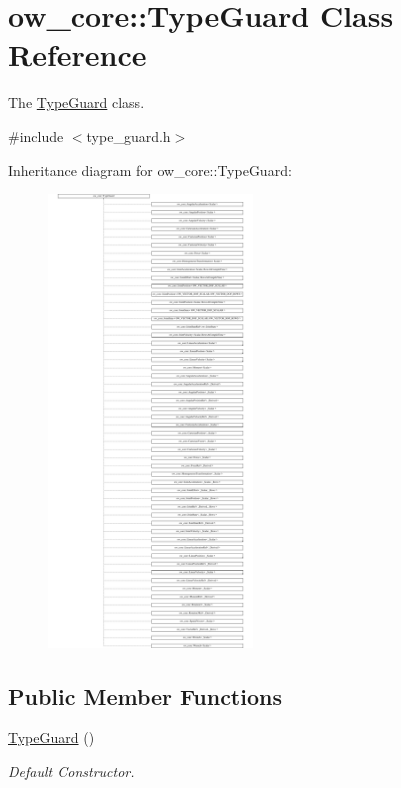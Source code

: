 \hypertarget{classow__core_1_1TypeGuard}{}\section{ow\+\_\+core\+:\+:Type\+Guard Class Reference}
\label{classow__core_1_1TypeGuard}


The \hyperlink{classow__core_1_1TypeGuard}{Type\+Guard} class.  




{\ttfamily \#include $<$type\+\_\+guard.\+h$>$}

Inheritance diagram for ow\+\_\+core\+:\+:Type\+Guard\+:\begin{figure}[H]
\begin{center}
\leavevmode
\includegraphics[height=12.000000cm]{df/d06/classow__core_1_1TypeGuard}
\end{center}
\end{figure}
\subsection*{Public Member Functions}
\begin{DoxyCompactItemize}
\item 
\hyperlink{classow__core_1_1TypeGuard_a66a5c5d64c63c4a6585a7fc15238fe7e}{Type\+Guard} ()\hypertarget{classow__core_1_1TypeGuard_a66a5c5d64c63c4a6585a7fc15238fe7e}{}\label{classow__core_1_1TypeGuard_a66a5c5d64c63c4a6585a7fc15238fe7e}

\begin{DoxyCompactList}\small\item\em Default Constructor. \end{DoxyCompactList}\end{DoxyCompactItemize}


